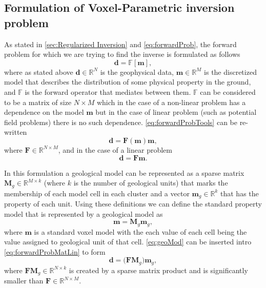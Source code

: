 \subsection{Formulation of Voxel-Parametric inversion problem}
\label{subsec:voxelParamFormulation}

As stated in \autoref{sec:Regularized Inversion} and \autoref{eq:forwardProb}, the forward problem for which we are trying to find the inverse is formulated as follows
\begin{equation}
\mathbf d = \mathbb F [\mathbf m], \label{eq:forwardProbTools}
\end{equation}
where as stated above $\mathbf d \in \mathbb R^N$ is the geophysical data, $\mathbf m \in \mathbb R^M$ is the discretized model that describes the distribution of some physical property in the ground, and $\mathbb F$ is the forward operator that mediates between them. $\mathbb F$ can be considered to be a matrix of size $N\times M$ which in the case of a non-linear problem has a dependence on the model $\mathbf m$ but in the case of linear problem (such as potential field problems) there is no such dependence. \autoref{eq:forwardProbTools} can be re-written
\begin{equation}
\mathbf d = \mathbf F(\mathbf m)\mathbf m, \label{eq:forwardProbMat}
\end{equation}
where $\mathbf F \in \mathbb R^{N\times M}$, and in the case of a linear problem
\begin{equation}
\mathbf d = \mathbf F\mathbf m. \label{eq:forwardProbMatLin}
\end{equation}

In this formulation a geological model can be represented as a sparse matrix $\mathbf{M}_g \in \mathbb R^{M\times k}$ (where $k$ is the number of geological units) that marks the membership of each model cell in each cluster and a vector $\mathbf m_g \in \mathbb R^{k}$ that has the property of each unit. Using these definitions we can define the standard property model that is represented by a geological model as
\begin{equation}
\mathbf m = \mathbf M_g\mathbf m_g, \label{eq:geoMod}
\end{equation}
where $\mathbf m$ is a standard voxel model with the each value of each cell being the value assigned to geological unit of that cell. \autoref{eq:geoMod} can be inserted intro \autoref{eq:forwardProbMatLin} to form 
\begin{equation}
\mathbf d = \big(\mathbf F\mathbf M_g\big)\mathbf m_g, \label{eq:forwardProbMatLinGeo}
\end{equation}
where $\mathbf F\mathbf M_g \in \mathbb R^{N\times k}$ is created by a sparse matrix product and is significantly smaller than $\mathbf F \in \mathbb R^{N\times M}$.

